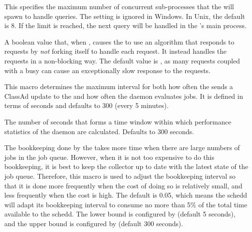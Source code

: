 \begin{description}
\label{param:ScheddQueryWorkers}
\item[\Macro{SCHEDD\_QUERY\_WORKERS}]
  This specifies the maximum number of concurrent sub-processes that
  the  will spawn to handle queries.  The setting is
  ignored in Windows.  In Unix, the default is 8.  If the limit is
  reached, the next query will be handled in the 's main
  process.

\label{param:CondorQUseV3Protocol}
\item[\Macro{CONDOR\_Q\_USE\_V3\_PROTOCOL}]
  A boolean value that, when ,
  causes the  to use an algorithm that responds to 
   requests by \emph{not} forking itself to handle each request.
  It instead handles the requests in a non-blocking way.
  The default value is ,
  as many  requests coupled with a busy 
  can cause an exceptionally slow response to the  requests.

\label{param:ScheddInterval}
\item[\Macro{SCHEDD\_INTERVAL}]
  This macro determines the maximum interval for both how often the
   sends a ClassAd update to the  and
  how often the  daemon evaluates jobs.  It is defined
  in terms of seconds and defaults to 300 (every 5 minutes).

\label{param:WindowedStatWidth}
\item[\Macro{WINDOWED\_STAT\_WIDTH}]
  The number of seconds that forms a time window within which performance
  statistics of the  daemon are calculated.
  Defaults to 300 seconds.

\label{param:ScheddIntervalTimeslice}
\item[\Macro{SCHEDD\_INTERVAL\_TIMESLICE}]
  The bookkeeping done by the
   takes more time when there are large numbers of jobs
  in the job queue.  However, when it is not too expensive to do this
  bookkeeping, it is best to keep the collector up to date with the
  latest state of the job queue.  Therefore, this macro is used to
  adjust the bookkeeping interval so that it is done more frequently
  when the cost of doing so is relatively small, and less frequently
  when the cost is high.  The default is 0.05, which means the schedd
  will adapt its bookkeeping interval to consume no more than 5\% of the
  total time available to the schedd.  The lower bound is configured by
   (default 5 seconds), and the upper bound
  is configured by  (default 300 seconds).



\end{description}
